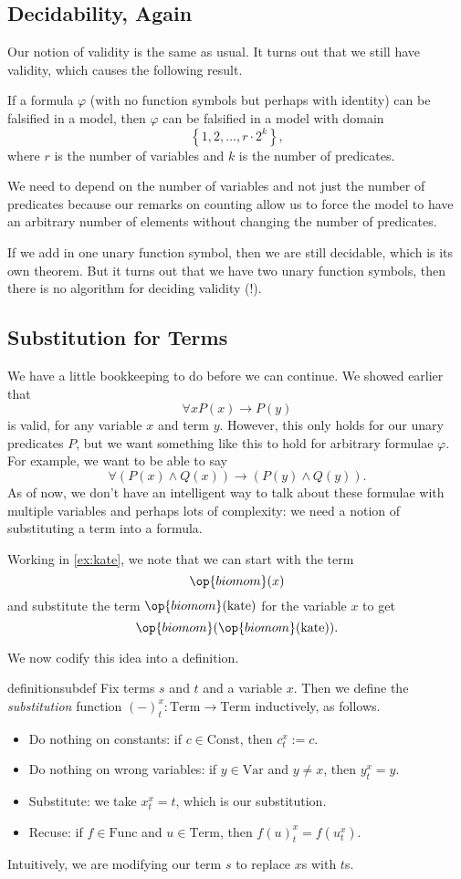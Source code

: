 \documentclass[../notes.tex]{subfiles}
\begin{document}
\subsection{Decidability, Again}
Our notion of validity is the same as usual. It turns out that we still have validity, which causes the following result.
\begin{lemma}
	If a formula $\varphi$ (with no function symbols but perhaps with identity) can be falsified in a model, then $\varphi$ can be falsified in a model with domain
	\[\left\{1,2,\ldots,r\cdot 2^k\right\},\]
	where $r$ is the number of variables and $k$ is the number of predicates.
\end{lemma}
\begin{remark}
	We need to depend on the number of variables and not just the number of predicates because our remarks on counting allow us to force the model to have an arbitrary number of elements without changing the number of predicates.
\end{remark}
If we add in one unary function symbol, then we are still decidable, which is its own theorem. But it turns out that we have two unary function symbols, then there is no algorithm for deciding validity (!).

\subsection{Substitution for Terms}
We have a little bookkeeping to do before we can continue. We showed earlier that
\[\forall xP(x)\to P(y)\]
is valid, for any variable $x$ and term $y$. However, this only holds for our unary predicates $P$, but we want something like this to hold for arbitrary formulae $\varphi$. For example, we want to be able to say
\[\forall(P(x)\land Q(x))\to(P(y)\land Q(y)).\]
As of now, we don't have an intelligent way to talk about these formulae with multiple variables and perhaps lots of complexity: we need a notion of substituting a term into a formula.
\begin{example}
	Working in \autoref{ex:kate}, we note that we can start with the term
	\[\op{biomom}(x)\]
	and substitute the term $\op{biomom}(\mathrm{kate})$ for the variable $x$ to get
	\[\op{biomom}(\op{biomom}(\mathrm{kate})).\]
\end{example}
We now codify this idea into a definition.
\begin{restatable}{definition}{subdef}
	Fix terms $s$ and $t$ and a variable $x$. Then we define the \textit{substitution} function $(-)_t^x:\mathrm{Term}\to\mathrm{Term}$ inductively, as follows.
	\begin{itemize}
		\item Do nothing on constants: if $c\in\mathrm{Const}$, then $c^x_t:=c$.
		\item Do nothing on wrong variables: if $y\in\mathrm{Var}$ and $y\ne x$, then $y^x_t=y$.
		\item Substitute: we take $x^x_t=t$, which is our substitution.
		\item Recuse: if $f\in\mathrm{Func}$ and $u\in\mathrm{Term}$, then $f(u)_t^x=f(u_t^x)$.
	\end{itemize}
\end{restatable}
\noindent Intuitively, we are modifying our term $s$ to replace $x$s with $t$s.
\end{document}
